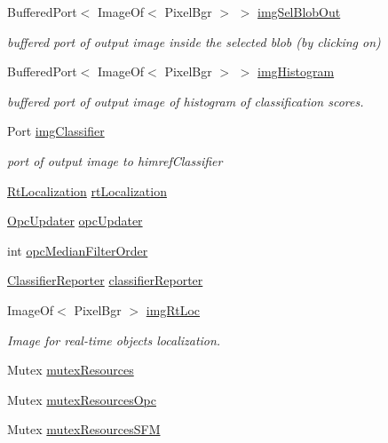 \begin{DoxyCompactItemize}
Buffered\+Port$<$ Image\+Of$<$ Pixel\+Bgr $>$ $>$ \hyperlink{group__iol2opc_a87d83209572c282b7705963c5bb7b7cb}{img\+Sel\+Blob\+Out}
\begin{DoxyCompactList}\small\item\em buffered port of output image inside the selected blob (by clicking on) \end{DoxyCompactList}\item 
Buffered\+Port$<$ Image\+Of$<$ Pixel\+Bgr $>$ $>$ \hyperlink{group__iol2opc_a2fafcb468ebabe79b1468b7ee0a0c570}{img\+Histogram}
\begin{DoxyCompactList}\small\item\em buffered port of output image of histogram of classification scores. \end{DoxyCompactList}\item 
Port \hyperlink{group__iol2opc_a9944166088f32d0f615418004b1011e0}{img\+Classifier}
\begin{DoxyCompactList}\small\item\em port of output image to himref\+Classifier \end{DoxyCompactList}\item 
\hyperlink{classRtLocalization}{Rt\+Localization} \hyperlink{group__iol2opc_a4ed8af58d3a1cc46b53d144b5bb12480}{rt\+Localization}
\item 
\hyperlink{classOpcUpdater}{Opc\+Updater} \hyperlink{group__iol2opc_a6a1af6a40656eab2ade00191f1cad20f}{opc\+Updater}
\item 
int \hyperlink{group__iol2opc_a6dbce7745268485f2d303b51836a424a}{opc\+Median\+Filter\+Order}
\item 
\hyperlink{classClassifierReporter}{Classifier\+Reporter} \hyperlink{group__iol2opc_a50b88ace7a1e0a3a1fa0b7d641ebac53}{classifier\+Reporter}
\item 
Image\+Of$<$ Pixel\+Bgr $>$ \hyperlink{group__iol2opc_acc3e8bbf7c6afc78a12fc8705bccd84a}{img\+Rt\+Loc}
\begin{DoxyCompactList}\small\item\em Image for real-\/time objects localization. \end{DoxyCompactList}\item 
Mutex \hyperlink{group__iol2opc_a16267d2158276e3d367d98d3e077ba57}{mutex\+Resources}
\item 
Mutex \hyperlink{group__iol2opc_a18cc1dcb526a5916632a12514769962a}{mutex\+Resources\+Opc}
\item 
Mutex \hyperlink{group__iol2opc_a305ce862e0e62c240498cba175f35944}{mutex\+Resources\+S\+FM}

\end{DoxyCompactItemize}
